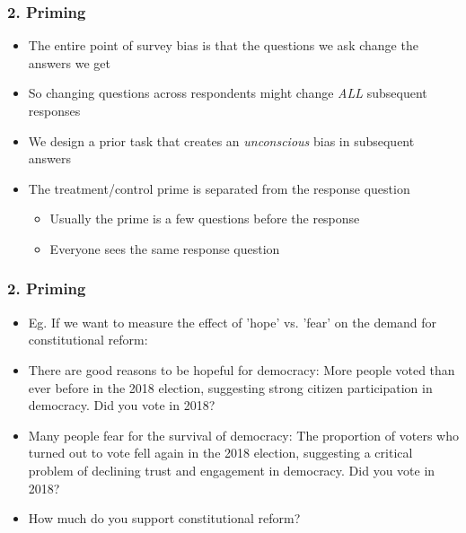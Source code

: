 \documentclass[xcolor=x11names,compress]{beamer}\usepackage[]{graphicx}\usepackage[]{color}
\renewcommand{\(}{\begin{columns}}
\renewcommand{\)}{\end{columns}}
\newcommand{\<}[1]{\begin{column}{#1}}
\renewcommand{\>}{\end{column}}
\begin{document}
\begin{frame}
\frametitle{2. Priming}
\begin{itemize}
\item The entire point of survey bias is that the questions we ask change the answers we get
\pause
\item So changing questions across respondents might change \textit{ALL} subsequent responses
\pause
\item We design a prior task that creates an \textit{unconscious} bias in subsequent answers
\pause
\item The treatment/control prime is separated from the response question
\pause
\begin{itemize}
\item Usually the prime is a few questions before the response
\pause
\item Everyone sees the same response question
\end{itemize}
\end{itemize}
\end{frame}

\begin{frame}
\frametitle{2. Priming}
\begin{itemize}
\item Eg. If we want to measure the effect of 'hope' vs. 'fear' on the demand for constitutional reform:
\pause
\item There are good reasons to be hopeful for democracy: More people voted than ever before in the 2018 election, suggesting strong citizen participation in democracy. Did you vote in 2018?
\pause
\item Many people fear for the survival of democracy: The proportion of voters who turned out to vote fell again in the 2018 election, suggesting a critical problem of declining trust and engagement in democracy. Did you vote in 2018?
\pause
\item How much do you support constitutional reform?
\end{itemize}
\end{frame}
\end{document}
